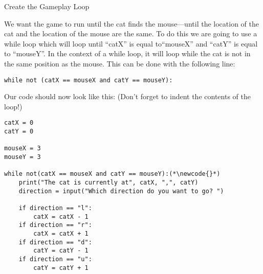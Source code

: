 \documentclass[12pt,oneside]{article}
\newcommand{\q}[1]{``#1''}
\newcommand{\subsectitle}[1]{
  \begin{flushleft}{\large#1}\end{flushleft}
}
\newcommand{\newcode}[0]{\hfill<--}
\begin{document}
\begin{minipage}{\textwidth}
\subsectitle{Create the Gameplay Loop}
We want the game to run until the cat finds the mouse---until the location of the cat and the location of the mouse are the same. To do this we are going to use a while loop which will loop until \q{catX} is equal to\q{mouseX} and \q{catY} is equal to \q{mouseY}. In the context of a while loop, it will loop while the cat is not in the same position as the mouse. This can be done with the following line:

\begin{lstlisting}
while not (catX == mouseX and catY == mouseY):
\end{lstlisting}

Our code should now look like this: (Don't forget to indent the contents of the loop!)

\begin{lstlisting}
catX = 0
catY = 0

mouseX = 3
mouseY = 3

while not(catX == mouseX and catY == mouseY):(*\newcode{}*)
    print("The cat is currently at", catX, ",", catY)
    direction = input("Which direction do you want to go? ")
    
    if direction == "l":
        catX = catX - 1
    if direction == "r":
        catX = catX + 1
    if direction == "d":
        catY = catY - 1
    if direction == "u":
        catY = catY + 1
\end{lstlisting}
\end{minipage}
\end{document}
